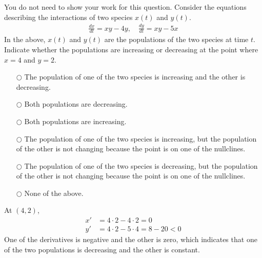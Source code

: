 \ifnum {}
\question[1] You do not need to show your work for this question. Consider the equations describing the interactions of two species $x(t)$ and $y(t)$.
\begin{align}
    \frac{dx}{dt} = xy-4y, \quad \frac{dy}{dt} = xy-5x
\end{align}
In the above, $x(t)$ and $y(t)$ are the populations of the two species at time $t$. Indicate whether the populations are increasing or decreasing at the point where $x=4$ and $y=2$. 
\begin{itemize}
    \item[$\bigcirc$] The population of one of the two species is increasing and the other is decreasing. 
    \item[$\bigcirc$]Both populations are decreasing.
    \item[$\bigcirc$]Both populations are increasing.
    \item[$\bigcirc$]The population of one of the two species is increasing, but the population of the other is not changing because the point is on one of the nullclines. 
    \item[$\bigcirc$]The population of one of the two species is decreasing, but the population of the other is not changing because the point is on one of the nullclines. 
    \item[$\bigcirc$]None of the above.
\end{itemize}
\ifnum {} {\color{DarkBlue}
At $(4,2)$, 
\begin{align}
    x' &= 4\cdot2 - 4\cdot 2 = 0\\
    y' &= 4\cdot2-5\cdot4 = 8 - 20 < 0
\end{align}
One of the derivatives is negative and the other is zero, which indicates that one of the two populations is decreasing and the other is constant. 
} 
\else 
\vspace{0.5cm}
\fi    
\fi 


